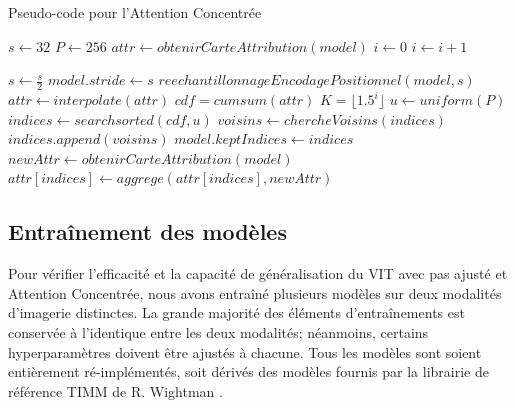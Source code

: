 \begin{algorithm}[!h]
	\caption{Pseudo-code pour l'Attention Concentrée}
	\label{algo:pseudoCodeFocusedAttention}
	\begin{algorithmic}[1]
		
		\State $s \gets 32$ 
		\State $P \gets 256$ 
		\State $attr  \gets obtenirCarteAttribution(model)$	
		\State $i \gets 0$
		\State $i \gets i+1$
		
		\State	$s \gets \frac{s}{2}$
		\State $model.stride \gets s$
		\State $reechantillonnageEncodagePositionnel(model, s)$
		\State $attr \gets interpolate(attr)$ 
		\State $cdf = cumsum(attr)$ 
		\State $K = \lfloor 1.5^i \rfloor$
		\State $u \gets uniform(P)$ 
		\State $indices \gets searchsorted(cdf, u)$ 
		\State $voisins \gets chercheVoisins(indices)$
		\State $indices.append(voisins )$
		\State $model.keptIndices \gets indices$ 
		\State $newAttr \gets obtenirCarteAttribution(model)$
		\State $attr[indices] \gets aggrege(attr[indices], newAttr)$
		
		\EndFor
		\EndWhile
	\end{algorithmic}
\end{algorithm}

\subsection{Entraînement des modèles}
Pour vérifier l'efficacité et la capacité de généralisation du \ac{VIT} avec pas ajusté et Attention Concentrée, nous avons entraîné plusieurs modèles sur deux modalités d'imagerie distinctes. La grande majorité des éléments d'entraînements est conservée à l'identique entre les deux modalités; néanmoins, certains hyperparamètres doivent être ajustés à chacune. Tous les modèles sont soient entièrement ré-implémentés, soit dérivés des modèles fournis par la librairie de référence TIMM de R. Wightman \cite{wightmanPyTorchImageModelsWightman}. 

